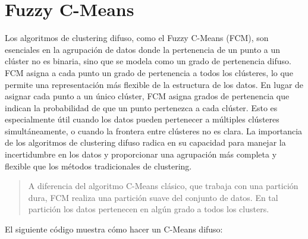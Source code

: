 \documentclass[
  a4paper,
  DIV=11,
  numbers=noendperiod]{scrreprt}
\begin{document}
\section{Fuzzy C-Means}\label{fuzzy-c-means}

Los algoritmos de clustering difuso, como el Fuzzy C-Means (FCM), son
esenciales en la agrupación de datos donde la pertenencia de un punto a
un clúster no es binaria, sino que se modela como un grado de
pertenencia difuso. FCM asigna a cada punto un grado de pertenencia a
todos los clústeres, lo que permite una representación más flexible de
la estructura de los datos. En lugar de asignar cada punto a un único
clúster, FCM asigna grados de pertenencia que indican la probabilidad de
que un punto pertenezca a cada clúster. Esto es especialmente útil
cuando los datos pueden pertenecer a múltiples clústeres
simultáneamente, o cuando la frontera entre clústeres no es clara. La
importancia de los algoritmos de clustering difuso radica en su
capacidad para manejar la incertidumbre en los datos y proporcionar una
agrupación más completa y flexible que los métodos tradicionales de
clustering.

\begin{quote}
A diferencia del algoritmo C-Means clásico, que trabaja con una
partición dura, FCM realiza una partición suave del conjunto de datos.
En tal partición los datos pertenecen en algún grado a todos los
clusters.
\end{quote}

El siguiente código muestra cómo hacer un C-Means difuso:
\end{document}
